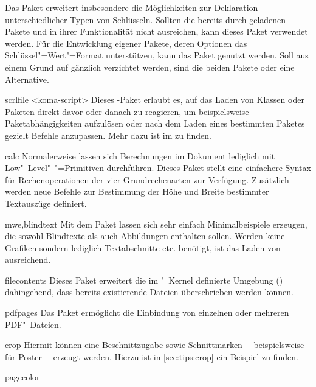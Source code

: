 \begin{packages}
  Das Paket  erweitert insbesondere die Möglichkeiten zur 
  Deklaration unterschiedlicher Typen von Schlüsseln. Sollten die bereits durch 
  \TUDScript geladenen Pakete  und  in ihrer 
  Funktionalität nicht ausreichen, kann dieses Paket verwendet werden. Für die 
  Entwicklung eigener Pakete, deren Optionen das Schlüssel"=Wert"=Format 
  unterstützen, kann das Paket  genutzt werden. Soll aus einem 
  Grund auf \KOMAScript{} gänzlich verzichtet werden, sind die beiden Pakete 
   oder  eine Alternative.
\item[scrlfile]<koma-script>
  Dieses \KOMAScript-Paket erlaubt es, auf das Laden von Klassen oder Paketen 
  direkt davor oder danach zu reagieren, um beispielsweise Paketabhängigkeiten 
  aufzulösen oder nach dem Laden eines bestimmten Paketes gezielt Befehle 
  anzupassen. Mehr dazu ist im \scrguide zu finden.
\item[calc]
  Normalerweise lassen sich Berechnungen im Dokument lediglich mit 
  Low"~Level"~"=Primitiven durchführen. Dieses Paket stellt eine 
  einfachere Syntax für Rechenoperationen der vier Grundrechenarten zur 
  Verfügung. Zusätzlich werden neue Befehle zur Bestimmung der Höhe und Breite 
  bestimmter Textauszüge definiert.
\item[mwe,blindtext]
  Mit dem Paket  lassen sich sehr einfach Minimalbeispiele 
  erzeugen, die sowohl Blindtexte als auch Abbildungen enthalten sollen. Werden 
  keine Grafiken sondern lediglich Textabschnitte etc. benötigt, ist das Laden 
  von  ausreichend.
\item[filecontents]
  Dieses Paket erweitert die im "~Kernel definierte Umgebung 
  () dahingehend, dass bereits 
  existierende Dateien überschrieben werden können.
\item[pdfpages]
  Das Paket ermöglicht die Einbindung von einzelnen oder mehreren PDF"~Dateien.
\item[crop]
  Hiermit können eine Beschnittzugabe sowie Schnittmarken~-- beispielsweise für 
  Poster~-- erzeugt werden. Hierzu ist in \autoref{sec:tips:crop} ein Beispiel 
  zu finden.
\item[pagecolor]

\end{packages}
